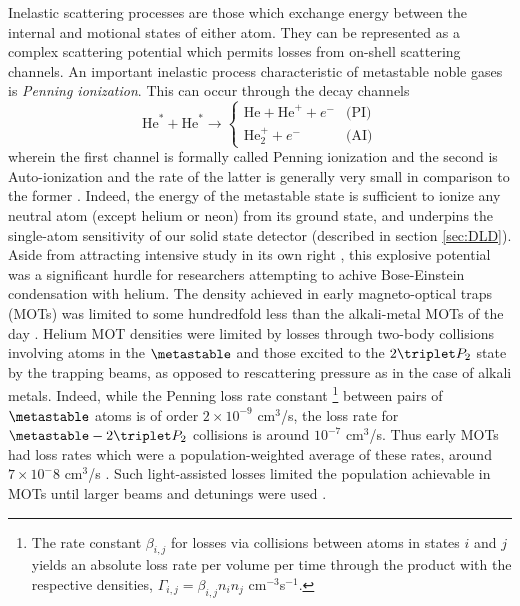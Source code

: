 	Inelastic scattering processes are those which exchange energy between the internal and motional states of either atom.
	They can be represented as a complex scattering potential \cite{Leo01} which permits losses from on-shell scattering channels.
	An important inelastic process characteristic of metastable noble gases \cite{VassenReview} is \emph{Penning ionization}.
	 This can occur through the decay channels
	\begin{equation}
		\textrm{He}^*+\textrm{He}^*\rightarrow 
		\begin{cases}
			\textrm{He}+ \textrm{He}^+ + e^-&\textrm{(PI)}\\
			\textrm{He}_{2}^{+} + e^-&\textrm{(AI)}
		\end{cases}
	\end{equation}
	wherein the first channel is formally called Penning ionization and the second is  Auto-ionization and the rate of the latter is generally very small in comparison to the former \cite{Muller91}.
	Indeed, the energy of the metastable state is sufficient to ionize any neutral atom (except helium or neon) from its ground state, and underpins the single-atom sensitivity of our solid state detector (described in section \ref{sec:DLD}).
	Aside from attracting intensive study in its own right \cite{Partridge10,Stas06,Mcnamara07}, this explosive potential was a significant hurdle for researchers attempting to achive Bose-Einstein condensation with helium.
	The density achieved in early magneto-optical traps (MOTs) was limited to some hundredfold less than the alkali-metal MOTs of the day \cite{Bardou92,Kumukura92,Mastwijk98}.
	Helium MOT densities were limited by losses through two-body collisions involving atoms in the $\metastable$ and those excited to the $2\triplet P_2$ state by the trapping beams, as opposed to rescattering pressure as in the case of alkali metals.
	Indeed, while the Penning loss rate constant \footnote{The rate constant $\beta_{i,j}$ for losses via collisions between atoms in states $i$ and $j$ yields an absolute loss rate per volume per time through the product with the respective densities, $\Gamma_{i,j} = \beta_{i,j}n_i n_j$ cm$^{-3}$s$^{-1}$.} between pairs of $\metastable$ atoms is of order $2\times10^{-9}$ cm$^3$/s, the loss rate for $\metastable-2\triplet P_2$  collisions is around $10^{-7}$ cm$^3$/s.
	Thus early MOTs had loss rates which were a population-weighted average of these rates, around $7\times10^-8$ cm$^3$/s \cite{Weiner99}.
	Such light-assisted losses  limited the population achievable in MOTs until larger beams and detunings were used \cite{Tol99}.
